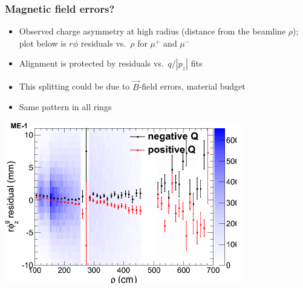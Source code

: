 \documentclass[compress]{beamer}
\begin{document}
\begin{frame}
\frametitle{Magnetic field errors?}

\begin{itemize}
\item Observed charge asymmetry at high radius (distance from the beamline $\rho$); plot below is $r\phi$ residuals vs.\ $\rho$ for $\mu^+$ and $\mu^-$
\item Alignment is protected by residuals vs.\ $q/|p_z|$ fits
\item This splitting could be due to $\vec{B}$-field errors, material budget
\item Same pattern in all rings
\end{itemize}

\begin{center}
\includegraphics[width=0.7\linewidth]{rphi_plots_vs_rho_mem1.png}
\end{center}
\end{frame}
\end{document}
